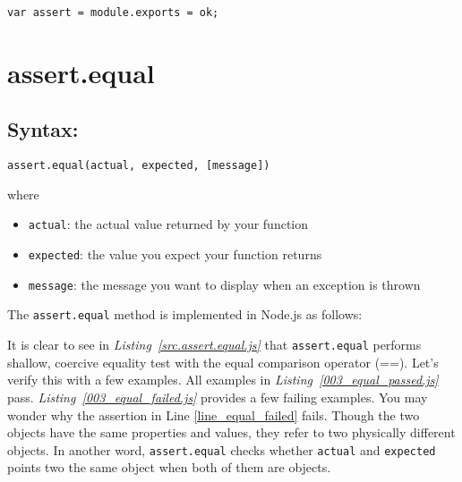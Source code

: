\lstinline$var assert = module.exports = ok;$
\section{assert.equal}
\label{sec:assert.equal}
\subsection*{Syntax:}
\begin{center}\texttt{assert.equal(actual, expected, [message])}

\end{center}where
\begin{itemize}
\item \texttt{actual}: the actual value returned by your function
\item \texttt{expected}: the value you expect your function returns
\item \texttt{message}: the message you want to display when an exception is thrown
\end{itemize}

The \lstinline$assert.equal$ method is implemented in Node.js as follows:

It is clear to see in \textit{Listing~\ref{src.assert.equal.js}} that \lstinline$assert.equal$ performs shallow, coercive equality test with the equal comparison operator (==). Let's verify this with a few examples.
All examples in \textit{Listing~\ref{003_equal_passed.js}} pass. \textit{Listing~\ref{003_equal_failed.js}} provides a few failing examples. You may wonder why the assertion in Line \ref{line_equal_failed} fails. Though the two objects have the same properties and values, they refer to two physically different objects. In another word, \lstinline$assert.equal$ checks whether 
\lstinline$actual$ and \lstinline$expected$ points two the same object when both of them are objects.

